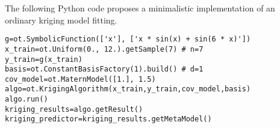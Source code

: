 \begin{otexample}
    The following Python code proposes a minimalistic \ot implementation of an ordinary kriging model fitting. 
    \lstset{style=mystyle, language=python}
\begin{lstlisting}
g=ot.SymbolicFunction(['x'], ['x * sin(x) + sin(6 * x)'])
x_train=ot.Uniform(0., 12.).getSample(7) # n=7
y_train=g(x_train)
basis=ot.ConstantBasisFactory(1).build() # d=1
cov_model=ot.MaternModel([1.], 1.5)
algo=ot.KrigingAlgorithm(x_train,y_train,cov_model,basis)
algo.run()
kriging_results=algo.getResult()
kriging_predictor=kriging_results.getMetaModel()
\end{lstlisting}
\end{otexample}
